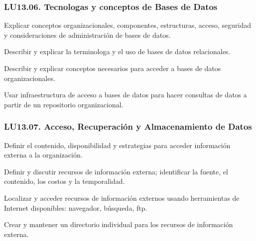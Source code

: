 \subsubsection{LU13.06. Tecnolog­as y conceptos de Bases de Datos}\label{sec:LU13.06}
\begin{LearningUnit}
\begin{LUGoal}
\item Explicar conceptos organizacionales, componentes, estructuras, acceso, seguridad y consideraciones de administración de bases de datos.
\end{LUGoal}

\begin{LUObjective}
\item Describir y explicar la terminolog­a y el uso de bases de datos relacionales.
\item Describir y explicar conceptos necesarios para acceder a bases de datos organizacionales.
\item Usar infraestructura de acceso a bases de datos para hacer consultas de datos a partir de un repositorio organizacional.
\end{LUObjective}
\end{LearningUnit}

\subsubsection{LU13.07. Acceso, Recuperación y Almacenamiento de Datos}\label{sec:LU13.07}
\begin{LearningUnit}
\begin{LUGoal}
\item Definir el contenido, disponibilidad y estrategias para acceder información externa a la organización.
\end{LUGoal}

\begin{LUObjective}
\item Definir y discutir recursos de información externa; identificar la fuente, el contenido, los costos y la temporalidad.
\item Localizar y acceder recursos de información externos usando herramientas de Internet disponibles: navegador, búsqueda, ftp.
\item Crear y mantener un directorio individual para los recursos de información externa.
\end{LUObjective}
\end{LearningUnit}

